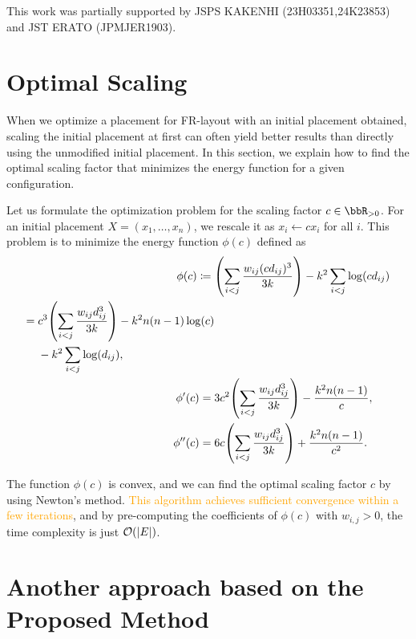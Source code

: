 \documentclass[dvipdfmx,journal]{IEEEtran}
\newcommand{\orange}[1]{\textcolor{orange}{#1}}
\newcommand{\defeq}{\coloneqq}
\begin{document}
This work was partially supported by JSPS KAKENHI (23H03351,24K23853) and JST ERATO (JPMJER1903).


\appendices

\section{Optimal Scaling}\label{sec:scaling}

When we optimize a placement for FR-layout with an initial placement obtained, scaling the initial placement at first can often yield better results than directly using the unmodified initial placement.
In this section, we explain how to find the optimal scaling factor that minimizes the energy function for a given configuration.

Let us formulate the optimization problem for the scaling factor $c \in \bbR_{> 0}$. For an initial placement $X = (x_1, \dots, x_n)$, we rescale it as $x_i \gets c x_i$ for all $i$.
This problem is to minimize the energy function $\phi(c)$ defined as
\begin{align*}
    \phi(c) \defeq {} & \qty(\sum_{i < j} \frac{w_{ij} (cd_{ij})^3}{3k}) - k^2 \sum_{i < j} \log(c d_{ij})                                   \\
    \begin{split}
        = {} & c^3 \qty(\sum_{i < j} \frac{w_{ij} d_{ij}^3}{3k}) - k^2 n(n-1)\log(c) \\
             & - k^2 \sum_{i < j} \log(d_{ij}),
    \end{split} \\
    \phi'(c) = {}     & 3c^2 \qty(\sum_{i < j} \frac{w_{ij} d_{ij}^3}{3k}) - \frac{k^2 n(n-1)}{c},                                           \\
    \phi''(c) = {}    & 6c \qty(\sum_{i < j} \frac{w_{ij} d_{ij}^3}{3k}) + \frac{k^2 n(n-1)}{c^2}.
\end{align*}

The function $\phi(c)$ is convex, and we can find the optimal scaling factor $c$ by using Newton's method.
\orange{This algorithm achieves sufficient convergence within a few iterations}, and by pre-computing the coefficients of $\phi(c)$ with $w_{i,j} > 0$, the time complexity is just $\order{\abs{E}}$.

\section{Another approach based on the Proposed Method}\label{sec:anotherApproach}
\end{document}
